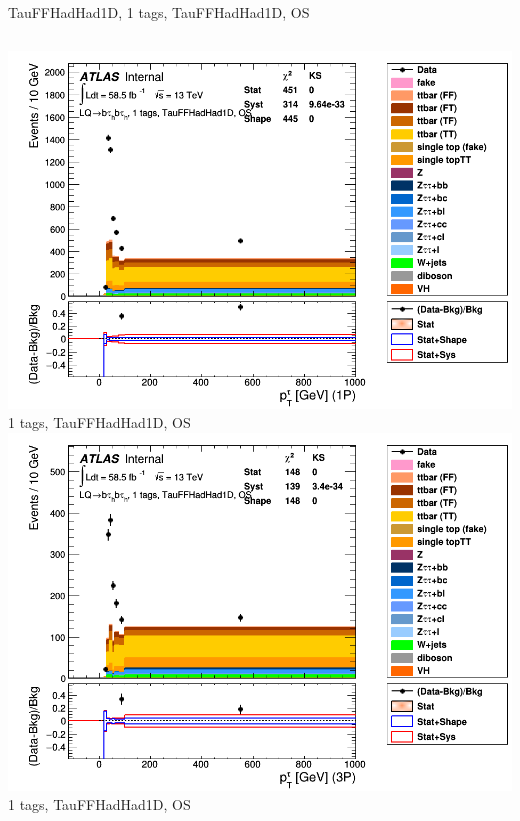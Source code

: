 \begin{frame}{TauFFHadHad1D, 1 tags, TauFFHadHad1D, OS}
  \begin{columns}[c]
    \centering\includegraphics[width=\textwidth]{C_1tag2pjet_0ptv_OS_TauPt1P}\\
    1 tags, TauFFHadHad1D, OS
    \centering\includegraphics[width=\textwidth]{C_1tag2pjet_0ptv_OS_TauPt3P}\\
    1 tags, TauFFHadHad1D, OS
  \end{columns}
  \begin{columns}[c]

\end{columns}
\end{frame}
